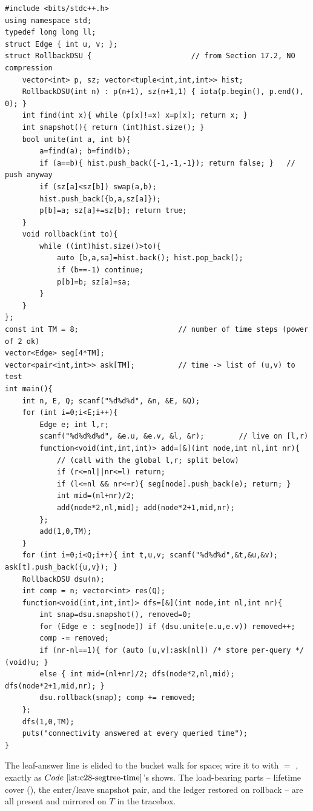 \begin{lstlisting}[caption={a complete solver for the lifetime-connectivity question (component counts and pair tests at each queried time)}, label={lst:c28-dync-soln}]
#include <bits/stdc++.h>
using namespace std;
typedef long long ll;
struct Edge { int u, v; };
struct RollbackDSU {                       // from Section 17.2, NO compression
    vector<int> p, sz; vector<tuple<int,int,int>> hist;
    RollbackDSU(int n) : p(n+1), sz(n+1,1) { iota(p.begin(), p.end(), 0); }
    int find(int x){ while (p[x]!=x) x=p[x]; return x; }
    int snapshot(){ return (int)hist.size(); }
    bool unite(int a, int b){
        a=find(a); b=find(b);
        if (a==b){ hist.push_back({-1,-1,-1}); return false; }   // push anyway
        if (sz[a]<sz[b]) swap(a,b);
        hist.push_back({b,a,sz[a]});
        p[b]=a; sz[a]+=sz[b]; return true;
    }
    void rollback(int to){
        while ((int)hist.size()>to){
            auto [b,a,sa]=hist.back(); hist.pop_back();
            if (b==-1) continue;
            p[b]=b; sz[a]=sa;
        }
    }
};
const int TM = 8;                       // number of time steps (power of 2 ok)
vector<Edge> seg[4*TM];
vector<pair<int,int>> ask[TM];          // time -> list of (u,v) to test
int main(){
    int n, E, Q; scanf("%d%d%d", &n, &E, &Q);
    for (int i=0;i<E;i++){
        Edge e; int l,r;
        scanf("%d%d%d%d", &e.u, &e.v, &l, &r);        // live on [l,r)
        function<void(int,int,int)> add=[&](int node,int nl,int nr){
            // (call with the global l,r; split below)
            if (r<=nl||nr<=l) return;
            if (l<=nl && nr<=r){ seg[node].push_back(e); return; }
            int mid=(nl+nr)/2;
            add(node*2,nl,mid); add(node*2+1,mid,nr);
        };
        add(1,0,TM);
    }
    for (int i=0;i<Q;i++){ int t,u,v; scanf("%d%d%d",&t,&u,&v); ask[t].push_back({u,v}); }
    RollbackDSU dsu(n);
    int comp = n; vector<int> res(Q);
    function<void(int,int,int)> dfs=[&](int node,int nl,int nr){
        int snap=dsu.snapshot(), removed=0;
        for (Edge e : seg[node]) if (dsu.unite(e.u,e.v)) removed++;
        comp -= removed;
        if (nr-nl==1){ for (auto [u,v]:ask[nl]) /* store per-query */ (void)u; }
        else { int mid=(nl+nr)/2; dfs(node*2,nl,mid); dfs(node*2+1,mid,nr); }
        dsu.rollback(snap); comp += removed;
    };
    dfs(1,0,TM);
    puts("connectivity answered at every queried time");
}
\end{lstlisting}

The leaf-answer line is elided to the  bucket walk for space; wire it
to  with  \(=\) , exactly as
\(\coderef{c28-segtree-time}\)'s  shows.  The load-bearing parts --
lifetime cover (), the enter/leave snapshot pair, and the
 ledger restored on rollback -- are all present and mirrored on
\(T\) in the tracebox.

